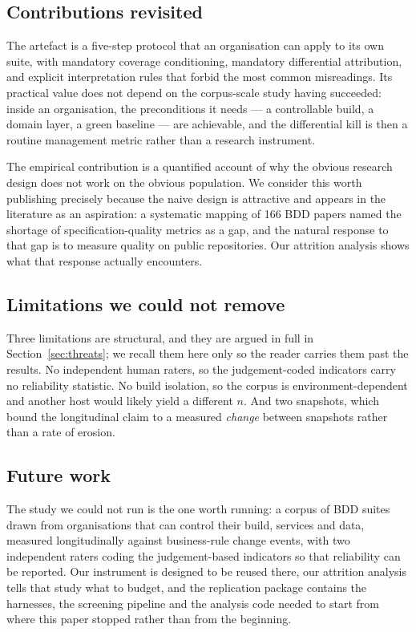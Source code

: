 \subsection{Contributions revisited}

The artefact is a five-step protocol that an organisation can apply to its own suite, with mandatory
coverage conditioning, mandatory differential attribution, and explicit interpretation rules that
forbid the most common misreadings. Its practical value does not depend on the corpus-scale study
having succeeded: inside an organisation, the preconditions it needs --- a controllable build, a
domain layer, a green baseline --- are achievable, and the differential kill is then a routine
management metric rather than a research instrument.

The empirical contribution is a quantified account of why the obvious research design does not work on
the obvious population. We consider this worth publishing precisely because the naive design is
attractive and appears in the literature as an aspiration: a systematic mapping of 166 BDD papers
named the shortage of specification-quality metrics as a gap, and the natural response to that gap is
to measure quality on public repositories. Our attrition analysis shows what that response actually
encounters.

\subsection{Limitations we could not remove}

Three limitations are structural, and they are argued in full in Section~\ref{sec:threats}; we recall
them here only so the reader carries them past the results. No independent human raters, so the
judgement-coded indicators carry no reliability statistic. No build isolation, so the corpus is
environment-dependent and another host would likely yield a different $n$. And two snapshots, which
bound the longitudinal claim to a measured \emph{change} between snapshots rather than a rate of
erosion.

\subsection{Future work}

The study we could not run is the one worth running: a corpus of BDD suites drawn from organisations
that can control their build, services and data, measured longitudinally against business-rule change
events, with two independent raters coding the judgement-based indicators so that reliability can be
reported. Our instrument is designed to be reused there, our attrition analysis tells that study what
to budget, and the replication package contains the harnesses, the screening pipeline and the analysis
code needed to start from where this paper stopped rather than from the beginning.
